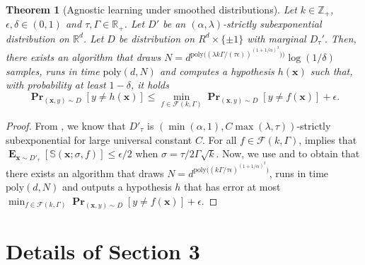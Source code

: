\documentclass[10pt,a4paper]{article}
\newtheorem{theorem}{Theorem}[section]
\renewcommand\vec[1]{\mathbf{#1}}
\DeclareMathOperator*{\pr}{\mathbf{Pr}}
\DeclareMathOperator*{\E}{\mathbf{E}}
\newcommand{\R}{\mathbb{R}}
\newcommand{\poly}{\mathrm{poly}}
\newcommand{\1}{\Ind}
\newcommand{\x}{\vec x}
\newcommand{\F}{\mathcal{F}}
\begin{document}
\begin{theorem}[Agnostic learning under smoothed distributions]
\label{corollary: agnostic_smoothed_subexp}
Let $k\in \mathbb{Z}_{+}$, $\epsilon,\delta\in (0,1)$ and $\tau,\Gamma\in \R_{+}$. Let $D'$ be an $(\alpha,\lambda)$-strictly subexponential distribution on $\R^d$. Let $D$ be distribution on $R^{d}\times \{\pm 1\}$ with marginal ${D}_{\tau}'$. Then, there exists an algorithm that draws $N=d^{\poly\bigl((\lambda k\Gamma/(\tau\epsilon))^{(1+1/\alpha)^3})\bigr)}\log(1/\delta)$ samples, runs in time $\poly(d,N)$ and computes a hypothesis $h(\x)$ such that, with probability at least $1-\delta$, it holds
\[
    \pr_{(\x,y)\sim D}[y\neq h(\x)]\leq \min_{f\in \F(k,\Gamma)}\pr_{(\x,y)\sim D}[y\neq f(\x)]+\epsilon.
\]
    
\end{theorem}
\begin{proof}
    From , we know that $D'_{\tau}$ is $(\min(\alpha,1), C\max(\lambda,\tau))$-strictly subexponential for large universal constant $C$. For all $f\in \F(k,\Gamma)$,  implies that $\E_{\x\sim D'_{\tau}}[\mathbb{S}(\x;\sigma,f)]\leq \epsilon/2$ when $\sigma=\tau/2\Gamma\sqrt{k}$. Now, we use  and  to obtain that there exists an algorithm that draws $N=d^{\poly\bigl((k\Gamma/\tau\epsilon)^{(1+1/\alpha)^3}\bigr)}$, runs in time $\poly(d,N)$ and outputs a hypothesis $h$ that has error at most $\min_{f\in \F(k,\Gamma)}\pr_{(\x,y)\sim D}[y\neq f(\x)]+\epsilon$.
 \end{proof}

\section{Details of Section 3}
\end{document}
